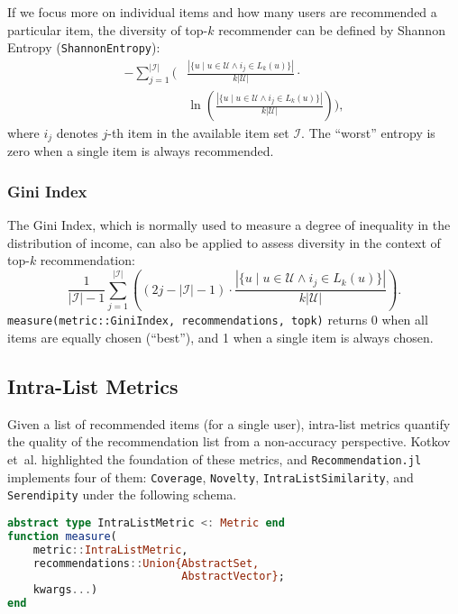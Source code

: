 If we focus more on individual items and how many users are recommended a particular item, the diversity of top-$k$ recommender can be defined by Shannon Entropy (\texttt{ShannonEntropy}):
\begin{align*}
-\sum_{j = 1}^{|\mathcal{I}|} \Bigg( & \frac{\left|\{u \mid u \in \mathcal{U} \wedge i_j \in L_k(u) \}\right|}{k |\mathcal{U}|} \cdot \\ 
& \ln \left( \frac{\left|\{u \mid u \in \mathcal{U} \wedge i_j \in L_k(u) \}\right|}{k |\mathcal{U}|}  \right) \Bigg),
\end{align*}
where $i_j$ denotes $j$-th item in the available item set $\mathcal{I}$. The ``worst'' entropy is zero when a single item is always recommended.

\subsubsection{Gini Index}

The Gini Index, which is normally used to measure a degree of inequality in the distribution of income, can also be applied to assess diversity in the context of top-$k$ recommendation:
\begin{equation*}
\frac{1}{|\mathcal{I}| - 1} \sum_{j = 1}^{|\mathcal{I}|} \left( (2j - |\mathcal{I}| - 1) \cdot \frac{\left|\{u \mid u \in \mathcal{U} \wedge i_j \in L_k(u) \}\right|}{k |\mathcal{U}|} \right).
\end{equation*}
\texttt{measure(metric::GiniIndex, recommendations, topk)} returns 0 when all items are equally chosen (``best''), and 1 when a single item is always chosen.

\subsection{Intra-List Metrics}
\label{sec:intra-list-metrics}

Given a list of recommended items (for a single user), intra-list metrics quantify the quality of the recommendation list from a non-accuracy perspective. Kotkov et~al. \cite{kotkov2016survey} highlighted the foundation of these metrics, and \texttt{Recommendation.jl} implements four of them: \texttt{Coverage}, \texttt{Novelty}, \texttt{IntraListSimilarity}, and \texttt{Serendipity} under the following schema.

\begin{lstlisting}[language = Julia]
abstract type IntraListMetric <: Metric end
function measure(
    metric::IntraListMetric, 
    recommendations::Union{AbstractSet, 
                           AbstractVector}; 
    kwargs...)
end
\end{lstlisting}

